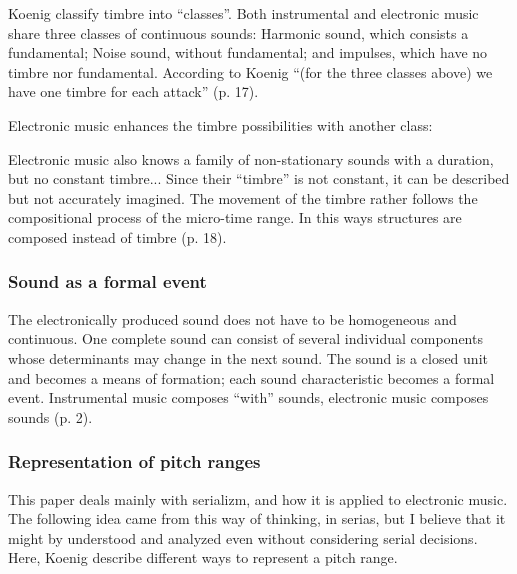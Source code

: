 \documentclass[a4paper,11pt]{article}
\newenvironment{MyShadequote}[1][]{%
    \ignorespaces%
    \begin{mdframed}[style=MyShadeQuoteStyle,#1]%
}{%
    \end{mdframed}%
    \ignorespacesafterend%
}%
\begin{document}
Koenig classify timbre into ``classes''.
Both instrumental and electronic music share three classes of continuous sounds:
Harmonic sound, which consists a fundamental; Noise sound, without fundamental; and impulses, which have no timbre nor fundamental.
According to Koenig ``(for the three classes above) we have one timbre for each attack'' (p. 17).

Electronic music enhances the timbre possibilities with another class:

\begin{MyShadequote}
 Electronic music also knows a family of non-stationary sounds with a duration, but no constant timbre...
 Since their ``timbre'' is not constant, it can be described but not accurately imagined.
 The movement of the timbre rather follows the compositional process of the micro-time range.
 In this ways structures are composed instead of timbre (p. 18).
\end{MyShadequote}

\subsubsection{Sound as a formal event}
\label{subs:koenig:event}

\begin{MyShadequote}
  The electronically produced sound does not have to be homogeneous and continuous.
  One complete sound can consist of several individual components whose determinants may change in the next sound.
  The sound is a closed unit and becomes a means of formation;
  each sound characteristic becomes a formal event.
  Instrumental music composes ``with'' sounds, electronic music composes sounds (p. 2).
\end{MyShadequote}

\subsubsection{Representation of pitch ranges}
\label{subs:koenig:pitch_ranges}

This paper deals mainly with serializm, and how it is applied to electronic music.
The following idea came from this way of thinking, in serias, but I believe that it might by understood and analyzed even without considering serial decisions.
Here, Koenig describe different ways to represent a pitch range.
\end{document}
